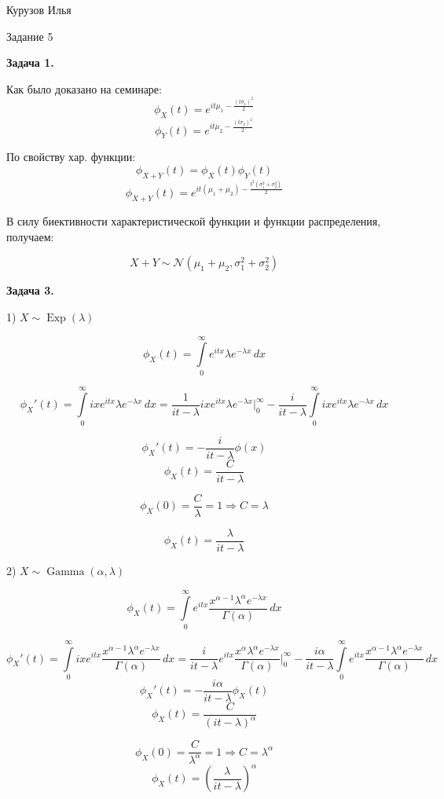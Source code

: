 \documentclass[12pt]{article}
\DeclareMathOperator*{\Exp}{Exp}
\DeclareMathOperator*{\Ga}{Gamma}
\begin{document}
\begin{center}
{Курузов Илья}

{Задание 5}
\end{center}

\begin{center}
\textbf{Задача 1.}
\end{center}

Как было доказано на семинаре:
$$\phi_X(t) = e^{it\mu_1 -\frac{(t\sigma_1)^2}{2}}$$
$$\phi_Y(t) = e^{it\mu_2 -\frac{(t\sigma_2)^2}{2}}$$

По свойству хар. функции:
$$\phi_{X+Y}(t) = \phi_X(t)\phi_Y(t)$$
$$\phi_{X+Y}(t) = e^{it(\mu_1 +\mu_2) -\frac{t^2(\sigma_1^2+\sigma_2^2)}{2}}$$

В силу биективности характеристической функции и функции распределения, получаем:

$$\boxed{X+Y\sim\mathcal{N}(\mu_1+\mu_2,\sigma_1^2+\sigma_2^2)}$$

\begin{center}
\textbf{Задача 3.}
\end{center}
1) $X\sim \Exp(\lambda)$

$$\phi_X(t) = \int\limits_0^\infty e^{itx}\lambda e^{-\lambda x}\,dx$$

$$\phi_X'(t) = \int\limits_0^\infty ix e^{itx}\lambda e^{-\lambda x}\,dx = \frac{1}{it-\lambda}ix e^{itx}\lambda e^{-\lambda x}\Big|_0^\infty - \frac{i}{it-\lambda}\int\limits_0^\infty ix e^{itx}\lambda e^{-\lambda x}\,dx $$

$$\phi_X'(t) =  - \frac{i}{it-\lambda}\phi(x) $$
$$\phi_X(t) = \frac{C}{it - \lambda}$$

$$\phi_X(0) = \frac{C}{\lambda} = 1\Rightarrow C = \lambda$$

$$\boxed{\phi_X(t) = \frac{\lambda}{it - \lambda}}$$

2) $X \sim \Ga(\alpha, \lambda)$

$$\phi_X(t) = \int\limits_0^\infty e^{itx}\frac{x^{\alpha-1}\lambda^\alpha e^{-\lambda x}}{\Gamma(\alpha)}\,dx$$

$$\phi_X'(t) = \int\limits_0^\infty ix e^{itx}\frac{x^{\alpha-1}\lambda^\alpha e^{-\lambda x}}{\Gamma(\alpha)}\,dx = \frac{i}{it -\lambda} e^{itx}\frac{x^{\alpha}\lambda^\alpha e^{-\lambda x}}{\Gamma(\alpha)}\Big|_0^\infty - \frac{i\alpha}{it-\lambda} \int\limits_0^\infty e^{itx}\frac{x^{\alpha-1}\lambda^\alpha e^{-\lambda x}}{\Gamma(\alpha)}\,dx$$
$$\phi_X'(t) = -\frac{i\alpha}{it - \lambda}\phi_X(t)$$
$$\phi_X(t) = \frac{C}{(it - \lambda)^\alpha}$$

$$\phi_X(0) = \frac{C}{\lambda^\alpha} = 1\Rightarrow C = \lambda^\alpha$$
$$\boxed{\phi_X(t) = \left(\frac{\lambda}{it - \lambda}\right)^\alpha}$$
\end{document}
